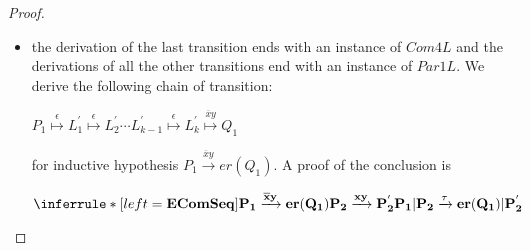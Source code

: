 \begin{proposition}
\begin{proof}
\begin{description}
\begin{description}
\begin{itemize}
 		    for inductive hypothesis $P_{1} \xrightarrow{\overline{x}y} er(Q_{1})$. A proof of the conclusion is
 		    \begin{center}
 		      $\inferrule* [left=\bf{EComSeq}]{
 			  P_{1} \xrightarrow{\overline{x}y} er(Q_{1})
 			\\
 			  P_{2}\xrightarrow{xy} P_{2}^{'}
 		      }{
 			P_{1}|P_{2} \xrightarrow{\tau} er(Q_{1})|P_{2}^{'}
 		      }$ 
 		    \end{center}
	      \item 
		the derivation of the last transition ends with an instance of $Com4L$ and the derivations of all the other transitions end with an instance of $Par1L$. We derive the following chain of transition:
 		    \begin{center}
 		      $P_{1} 
 			\stackrel{\epsilon}{\longmapsto} 
 			  L_{1}^{'} 
 			    \stackrel{\epsilon}{\longmapsto} 
 			      L_{2}^{'} 
 				\cdots 
 				  L_{k-1}^{'} 
 				    \stackrel{\epsilon}{\longmapsto} 
 				      L_{k}^{'}
 					\stackrel{\overline{x}y}{\longmapsto} 
 					  Q_{1}$
 		    \end{center}
 		    for inductive hypothesis $P_{1} \xrightarrow{\overline{x}y} er(Q_{1})$. A proof of the conclusion is
 		    \begin{center}
 		      $\inferrule* [left=\bf{EComSeq}]{
 			  P_{1} \xrightarrow{\overline{x}y} er(Q_{1})
 			\\
 			  P_{2}\xrightarrow{xy} P_{2}^{'}
 		      }{
 			P_{1}|P_{2} \xrightarrow{\tau} er(Q_{1})|P_{2}^{'}
 		      }$ 
 		    \end{center}
	    \end{itemize} 		
      \end{description}
    \end{description}
  \end{proof}
\end{proposition}



